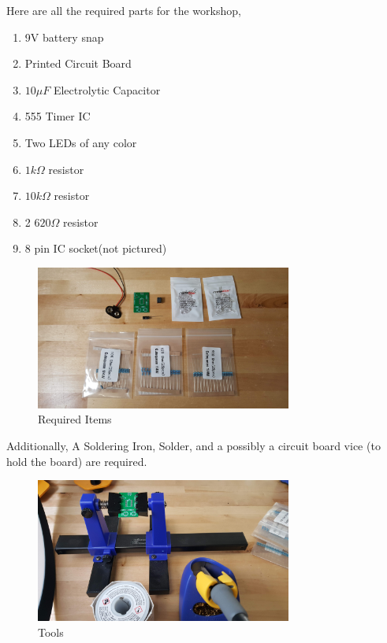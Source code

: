 \documentclass{article}
\begin{document}
    Here are all the required parts for the workshop,
    
    \begin{enumerate}
  
      \item 9V battery snap
      \item Printed Circuit Board
      \item $10\mu F$ Electrolytic Capacitor
      \item 555 Timer IC
      \item Two LEDs of any color
      \item $1k\Omega$ resistor
      \item $10k\Omega$ resistor
      \item 2 $620\Omega$ resistor
      \item 8 pin IC socket(not pictured)
    
  \end{enumerate}

    
\begin{figure}[H]
\caption{ Required Items }
\label{fig:img/0002.jpg}
\centering
\includegraphics[width=0.75\textwidth]{img/0002.jpg}
\end{figure}

    Additionally, A Soldering Iron, Solder, and a possibly a circuit board vice (to hold the board) are required.
    
\begin{figure}[H]
\caption{ Tools }
\label{fig:img/0004.jpg}
\centering
\includegraphics[width=0.75\textwidth]{img/0004.jpg}
\end{figure}
\end{document}
